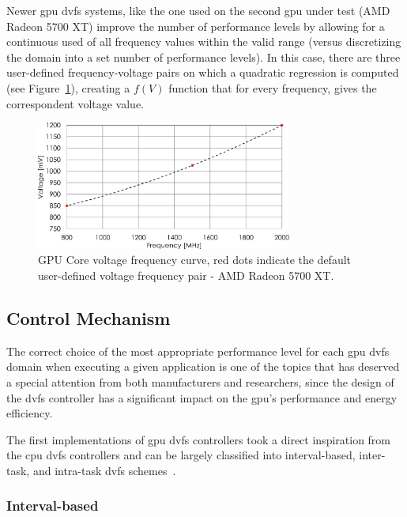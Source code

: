 Newer \acrshort{gpu} \acrshort{dvfs} systems, like the one used on the second \acrshort{gpu} under test (AMD Radeon 5700 XT) improve the number of performance levels by allowing for a continuous used of all frequency values within the valid range (versus discretizing the domain into a set number of performance levels). In this case, there are three user-defined frequency-voltage pairs on which a quadratic regression is computed  (see Figure~\ref{fig:voltage_curve}), creating a $f(V)$ function that for every frequency, gives the correspondent voltage value.

\begin{figure}[htb]
  \centering
  \includegraphics[width=0.75\textwidth]{Figures/Background/voltage_frequency_curve.pdf}
  \caption{GPU Core voltage frequency curve, red dots indicate the default user-defined voltage frequency pair - AMD Radeon 5700 XT.}
  \label{fig:voltage_curve}
\end{figure}

\subsection{Control Mechanism}

The correct choice of the most appropriate performance level for each \acrshort{gpu} \acrshort{dvfs} domain when executing a given application is one of the topics that has deserved a special attention from both manufacturers and researchers, since the design of the \acrshort{dvfs} controller has a significant impact on the \acrshort{gpu}'s performance and energy efficiency.

The first implementations of \acrshort{gpu} \acrshort{dvfs} controllers took a direct inspiration from the \acrshort{cpu} \acrshort{dvfs} controllers and can be largely classified into interval-based, inter-task, and intra-task \acrshort{dvfs} schemes~\cite{boyer_improving_2013}. 

\subsubsection{Interval-based}

